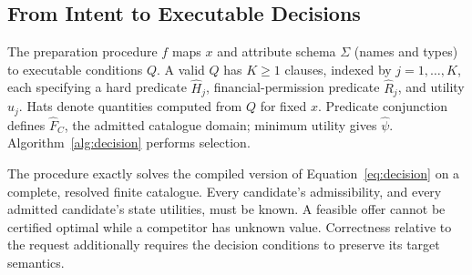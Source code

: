 \documentclass[11pt]{article}
\begin{document}
\subsection{From Intent to Executable Decisions}
\label{sec:realization}
\label{sec:contracts}
\label{sec:intent-dsl}
The preparation procedure $f$ maps $x$ and attribute schema $\Sigma$ (names and types) to executable conditions $Q$. A valid $Q$ has $K\ge1$ clauses, indexed by $j=1,\ldots,K$, each specifying a hard predicate $\widehat H_j$, financial-permission predicate $\widehat R_j$, and utility $\widehat u_j$. Hats denote quantities computed from $Q$ for fixed $x$. Predicate conjunction defines $\widehat F_C$, the admitted catalogue domain; minimum utility gives $\widehat\psi$. Algorithm~\ref{alg:decision} performs selection.

The procedure exactly solves the compiled version of Equation~\eqref{eq:decision} on a complete, resolved finite catalogue. Every candidate's admissibility, and every admitted candidate's state utilities, must be known. A feasible offer cannot be certified optimal while a competitor has unknown value. Correctness relative to the request additionally requires the decision conditions to preserve its target semantics.
\end{document}
